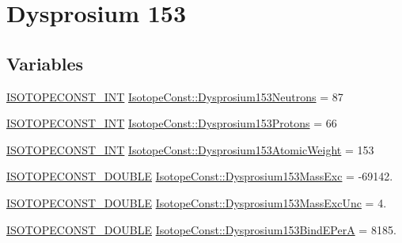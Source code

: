 \hypertarget{group___isotope_const-_dysprosium-_dy153}{}\section{Dysprosium 153}
\label{group___isotope_const-_dysprosium-_dy153}
\subsection*{Variables}
\begin{DoxyCompactItemize}
\item 
\mbox{\hyperlink{group___isotope_const-_macros_ga5f18360b3e99483a35c32d789e62621c}{I\+S\+O\+T\+O\+P\+E\+C\+O\+N\+S\+T\+\_\+\+I\+NT}} \mbox{\hyperlink{group___isotope_const-_dysprosium-_dy153_ga05fee44058cef3ff719af7a8934d6789}{Isotope\+Const\+::\+Dysprosium153\+Neutrons}} = 87
\item 
\mbox{\hyperlink{group___isotope_const-_macros_ga5f18360b3e99483a35c32d789e62621c}{I\+S\+O\+T\+O\+P\+E\+C\+O\+N\+S\+T\+\_\+\+I\+NT}} \mbox{\hyperlink{group___isotope_const-_dysprosium-_dy153_gaa7f3beb3a6e03d5114921774eb2b99c7}{Isotope\+Const\+::\+Dysprosium153\+Protons}} = 66
\item 
\mbox{\hyperlink{group___isotope_const-_macros_ga5f18360b3e99483a35c32d789e62621c}{I\+S\+O\+T\+O\+P\+E\+C\+O\+N\+S\+T\+\_\+\+I\+NT}} \mbox{\hyperlink{group___isotope_const-_dysprosium-_dy153_ga8248e1ec3d6ac380fcad549ad5c2b17a}{Isotope\+Const\+::\+Dysprosium153\+Atomic\+Weight}} = 153
\item 
\mbox{\hyperlink{group___isotope_const-_macros_ga8f45a7272ce02c0b4c65c44636ed719a}{I\+S\+O\+T\+O\+P\+E\+C\+O\+N\+S\+T\+\_\+\+D\+O\+U\+B\+LE}} \mbox{\hyperlink{group___isotope_const-_dysprosium-_dy153_ga09fe9ae43dac5b64030de60750e90c44}{Isotope\+Const\+::\+Dysprosium153\+Mass\+Exc}} = -\/69142.
\item 
\mbox{\hyperlink{group___isotope_const-_macros_ga8f45a7272ce02c0b4c65c44636ed719a}{I\+S\+O\+T\+O\+P\+E\+C\+O\+N\+S\+T\+\_\+\+D\+O\+U\+B\+LE}} \mbox{\hyperlink{group___isotope_const-_dysprosium-_dy153_gacfd6de0262410b73094d1413f9a9ab4b}{Isotope\+Const\+::\+Dysprosium153\+Mass\+Exc\+Unc}} = 4.
\item 
\mbox{\hyperlink{group___isotope_const-_macros_ga8f45a7272ce02c0b4c65c44636ed719a}{I\+S\+O\+T\+O\+P\+E\+C\+O\+N\+S\+T\+\_\+\+D\+O\+U\+B\+LE}} \mbox{\hyperlink{group___isotope_const-_dysprosium-_dy153_ga83eb3fa173644387f04bfa0e08a9f98d}{Isotope\+Const\+::\+Dysprosium153\+Bind\+E\+PerA}} = 8185.

\end{DoxyCompactItemize}
